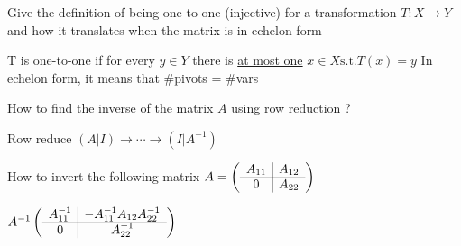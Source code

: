 \documentclass[12pt]{article}
\newcommand*{\xfield}[1]{\begin{mdframed}\centering #1\end{mdframed}\bigskip}
\newenvironment{note}{}{}
\begin{document}
\begin{note}
    \xfield{Give the definition of being one-to-one (injective) for a transformation $T : X \rightarrow Y$ and how it translates when the matrix is in echelon form}
    \xfield{T is one-to-one if for every \begin{math}y \in Y\end{math} there is \underline{at most one} \begin{math}x \in X \text{s.t.} T(x)=y\end{math} In echelon form, it means that \#pivots = \#vars}
\end{note}

\begin{note}
\xfield{How to find the inverse of the matrix $A$ using row reduction ?}
\xfield{Row reduce $(A\lvert I) \rightarrow \cdots \rightarrow (I \lvert A^{-1})$}
\end{note}

\begin{note}
\xfield{How to invert the following matrix  $ A = \left(
    \begin{array}{c|c}
      A_{11}&A_{12}\\\cline{1-2}
      0&A_{22}
    \end{array}
  \right)$}
\xfield{$A^{-1} \left(
    \begin{array}{c|c}
      A^{-1}_{11}&-A^{-1}_{11}A_{12}A^{-1}_{22}\\\cline{1-2}
      0&A^{-1}_{22}
    \end{array}
  \right)$}
\end{note}
\end{document}
